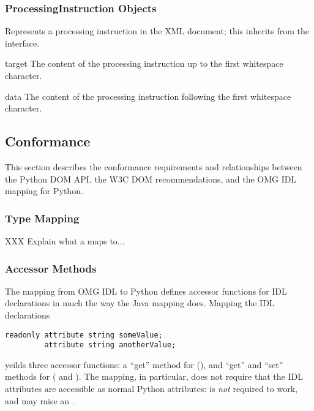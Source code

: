 \subsubsection{ProcessingInstruction Objects \label{dom-pi-objects}}

Represents a processing instruction in the XML document; this inherits
from the  interface.

\begin{memberdesc}[ProcessingInstruction]{target}
The content of the processing instruction up to the first whitespace
character.
\end{memberdesc}

\begin{memberdesc}[ProcessingInstruction]{data}
The content of the processing instruction following the first
whitespace character.
\end{memberdesc}


\subsection{Conformance \label{dom-conformance}}

This section describes the conformance requirements and relationships
between the Python DOM API, the W3C DOM recommendations, and the OMG
IDL mapping for Python.

\subsubsection{Type Mapping \label{dom-type-mapping}}

XXX  Explain what a  maps to...

\subsubsection{Accessor Methods \label{dom-accessor-methods}}

The mapping from OMG IDL to Python defines accessor functions for IDL
 declarations in much the way the Java mapping
does.  Mapping the IDL declarations

\begin{verbatim}
readonly attribute string someValue;
         attribute string anotherValue;
\end{verbatim}

yeilds three accessor functions:  a ``get'' method for
 (), and ``get'' and
``set'' methods for
 ( and
).  The mapping, in particular, does not
require that the IDL attributes are accessible as normal Python
attributes:   is \emph{not} required to
work, and may raise an .


